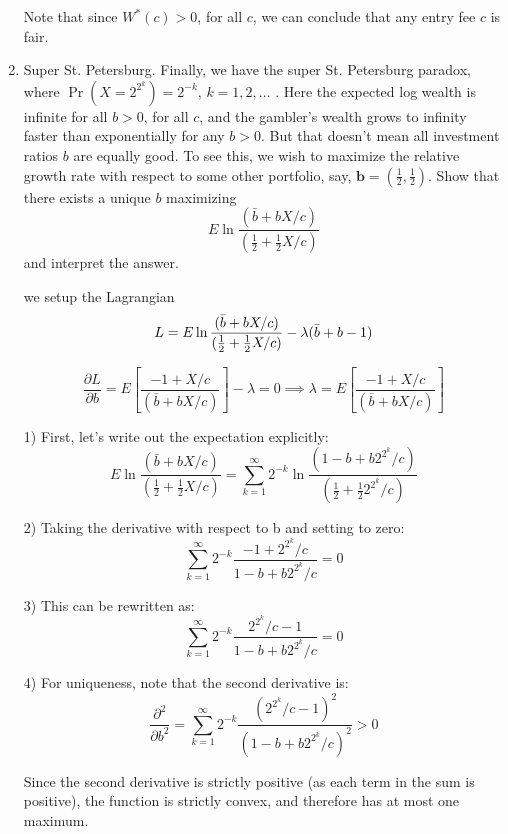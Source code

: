 \documentclass{article}
\begin{document}
\begin{enumerate}
    Note that since $W^*(c) > 0$, for all $c$, we can conclude that any entry fee $c$ is fair.

    \item Super St. Petersburg. Finally, we have the super St. Petersburg paradox, where $\Pr(X = 2^{2^k}) = 2^{-k}$, $k = 1, 2, \ldots$ . Here the expected log wealth is infinite for all $b > 0$, for all $c$, and the gambler's wealth grows to infinity faster than exponentially for any $b > 0$. But that doesn't mean all investment ratios $b$ are equally good. To see this, we wish to maximize the relative growth rate with respect to some other portfolio, say, $\mathbf{b} = (\frac{1}{2}, \frac{1}{2})$. Show that there exists a unique $b$ maximizing
    \[
        E \ln \frac{(\bar{b} + bX/c)}{(\frac{1}{2} + \frac{1}{2}X/c)}
    \]
    and interpret the answer.

    we setup the Lagrangian
    \[
        L = E \ln \frac{(\bar{b} + bX/c)}{(\frac{1}{2} + \frac{1}{2}X/c)} - \lambda(\bar{b} + b -1 )\\
    \]

    \[
        \frac{\partial L}{\partial b} = E\left[\frac{-1 + X/c}{(\bar{b} + bX/c)}\right] - \lambda = 0 \implies \lambda =  E\left[\frac{-1 + X/c}{(\bar{b} + bX/c)}\right]
    \]

    1) First, let's write out the expectation explicitly:
    \[
        E \ln \frac{(\bar{b} + bX/c)}{(\frac{1}{2} + \frac{1}{2}X/c)} = \sum_{k=1}^{\infty} 2^{-k} \ln \frac{(1-b + b2^{2^k}/c)}{(\frac{1}{2} + \frac{1}{2}2^{2^k}/c)}
    \]

    2) Taking the derivative with respect to b and setting to zero:
    \[
        \sum_{k=1}^{\infty} 2^{-k} \frac{-1 + 2^{2^k}/c}{1-b + b2^{2^k}/c} = 0
    \]

    3) This can be rewritten as:
    \[
        \sum_{k=1}^{\infty} 2^{-k} \frac{2^{2^k}/c - 1}{1-b + b2^{2^k}/c} = 0
    \]

    4) For uniqueness, note that the second derivative is:
    \[
        \frac{\partial^2}{\partial b^2} = \sum_{k=1}^{\infty} 2^{-k} \frac{(2^{2^k}/c - 1)^2}{(1-b + b2^{2^k}/c)^2} > 0
    \]

    Since the second derivative is strictly positive (as each term in the sum is positive), the function is strictly convex, and therefore has at most one maximum.

\end{enumerate}





\end{document}
